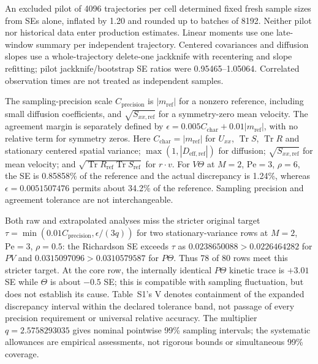 An excluded pilot of 4096 trajectories per cell determined fixed fresh sample sizes from SEs alone, inflated by 1.20 and rounded up to batches of 8192. Neither pilot nor historical data enter production estimates. Linear moments use one late-window summary per independent trajectory. Centered covariances and diffusion slopes use a whole-trajectory delete-one jackknife with recentering and slope refitting; pilot jackknife/bootstrap SE ratios were 0.95465--1.05064. Correlated observation times are not treated as independent samples.

The sampling-precision scale $C_{\mathrm{precision}}$ is $|m_{\mathrm{ref}}|$ for a nonzero reference, including small diffusion coefficients, and $\sqrt{S_{xx,\mathrm{ref}}}$ for a symmetry-zero mean velocity. The agreement margin is separately defined by $\epsilon=0.005C_{\mathrm{char}}+0.01|m_{\mathrm{ref}}|$, with no relative term for symmetry zeros. Here $C_{\mathrm{char}}=|m_{\mathrm{ref}}|$ for $U_{xx}$, $\operatorname{Tr}S$, $\operatorname{Tr}R$ and stationary centered spatial variance; $\max(1,|D_{\mathrm{eff,ref}}|)$ for diffusion; $\sqrt{S_{xx,\mathrm{ref}}}$ for mean velocity; and $\sqrt{\operatorname{Tr}R_{\mathrm{ref}}\operatorname{Tr}S_{\mathrm{ref}}}$ for $r\cdot v$. For $V\Theta$ at $M=2$, $\mathrm{Pe}=3$, $\rho=6$, the SE is 0.85858\% of the reference and the actual discrepancy is 1.24\%, whereas $\epsilon=0.0051507476$ permits about 34.2\% of the reference. Sampling precision and agreement tolerance are not interchangeable.

Both raw and extrapolated analyses miss the stricter original target $\tau=\min(0.01C_{\mathrm{precision}},\epsilon/(3q))$ for two stationary-variance rows at $M=2$, $\mathrm{Pe}=3$, $\rho=0.5$: the Richardson SE exceeds $\tau$ as $0.0238650088>0.0226464282$ for $PV$ and $0.0315097096>0.0310579587$ for $P\Theta$. Thus 78 of 80 rows meet this stricter target. At the core row, the internally identical $P\Theta$ kinetic trace is $+3.01$ SE while $\Theta$ is about $-0.5$ SE; this is compatible with sampling fluctuation, but does not establish its cause. Table~S1's V denotes containment of the expanded discrepancy interval within the declared tolerance band, not passage of every precision requirement or universal relative accuracy. The multiplier $q=2.5758293035$ gives nominal pointwise 99\% sampling intervals; the systematic allowances are empirical assessments, not rigorous bounds or simultaneous 99\% coverage.



